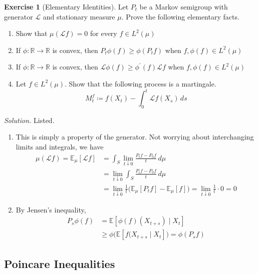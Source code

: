 \documentclass{article}
\theoremstyle{definition}
\newtheorem{exercise}{Exercise}[section]
\theoremstyle{remark}
\theoremstyle{definition}
\newenvironment{solution}{\noindent \textit{Solution.}}{}
\begin{document}
\begin{exercise}[Elementary Identities]
Let $P_t$ be a Markov semigroup with generator $\mathscr{L}$ and stationary measure $\mu$. Prove the following elementary facts. 
\begin{enumerate}
    \item Show that $\mu( \mathscr{L} f) = 0$ for every $f \in L^2 (\mu)$ 
    \item If $\phi : \mathbb{R} \rightarrow \mathbb{R}$ is convex, then $P_t \phi (f) \geq \phi (P_t f)$ when $f, \phi(f) \in L^2(\mu)$ 
    \item If $\phi : \mathbb{R} \rightarrow \mathbb{R}$ is convex, then $\mathscr{L} \phi(f) \geq \phi^\prime (f) \mathscr{L} f$ when $f, \phi(f) \in L^2 (\mu)$ 
    \item Let $f \in L^2 (\mu)$. Show that the following process is a martingale. 
    \[M_t^f \coloneqq f(X_t) - \int_0^t \mathscr{L} f(X_s) \,ds\]
\end{enumerate}
\end{exercise}
\begin{solution}
Listed. 
\begin{enumerate}
    \item This is simply a property of the generator. Not worrying about interchanging limits and integrals, we have 
    \begin{align*}
        \mu(\mathscr{L} f) = \mathbb{E}_\mu [\mathscr{L} f] & = \int_S \lim_{t \downarrow 0} \frac{P_t f - P_0 f}{t} \,d\mu \\ 
        & = \lim_{t \downarrow 0} \int_S \frac{P_t f - P_0 f}{t} \,d\mu \\
        & = \lim_{t \downarrow 0} \frac{1}{t} \big( \mathbb{E}_\mu [P_t f] - \mathbb{E}_\mu [f] \big) = \lim_{t \downarrow 0} \frac{1}{t} \cdot 0 = 0 
    \end{align*}
    
    \item By Jensen's inequality, 
    \begin{align*}
        P_s \phi(f) & = \mathbb{E} [ \phi(f) (X_{t + s}) \mid X_t] \\
        & \geq \phi \bigg( \mathbb{E}[f(X_{t + s} \mid X_t] \big) = \phi(P_s f)
    \end{align*}

\end{enumerate}
\end{solution}


\subsection{Poincare Inequalities}
\end{document}
